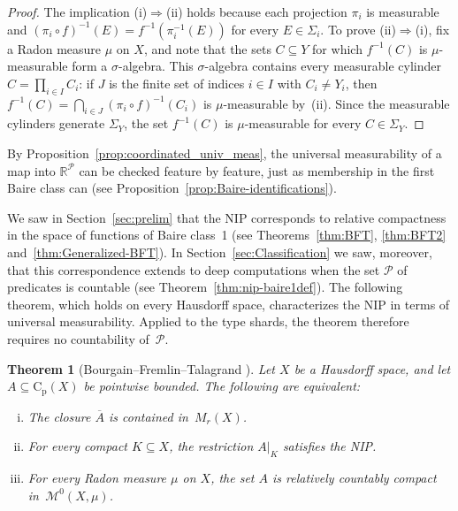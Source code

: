 \documentclass[psamsfonts]{amsart}
\newtheorem{thm}{Theorem}[section]
\theoremstyle{definition}
\theoremstyle{remark}
\newcommand{\Cp}{\mathrm{C}_{\mathrm{p}}}
\numberwithin{equation}{section}
\begin{document}
\begin{proof}
  The implication (i)$\Rightarrow$(ii) holds because each projection $\pi_i$ is measurable and $(\pi_i\circ f)^{-1}(E)=f^{-1}(\pi_i^{-1}(E))$ for every $E\in\Sigma_i$.
  To prove (ii)$\Rightarrow$(i), fix a Radon measure $\mu$ on $X$, and note that the sets $C\subseteq Y$ for which $f^{-1}(C)$ is $\mu$-measurable form a $\sigma$-algebra.
  This $\sigma$-algebra contains every measurable cylinder $C=\prod_{i\in I}C_i$:
  if $J$ is the finite set of indices $i\in I$ with $C_i\neq Y_i$, then $f^{-1}(C)=\bigcap_{i\in J}(\pi_i\circ f)^{-1}(C_i)$ is $\mu$-measurable by~(ii).
  Since the measurable cylinders generate $\Sigma_Y$, the set $f^{-1}(C)$ is $\mu$-measurable for every $C\in\Sigma_Y$.
\end{proof}

By Proposition~\ref{prop:coordinated_univ_meas}, the universal measurability of a map into $\mathbb{R}^\mathcal{P}$ can be checked feature by feature, just as membership in the first Baire class can (see Proposition~\ref{prop:Baire-identifications}).

We saw in Section~\ref{sec:prelim} that the NIP corresponds to relative compactness in the space of functions of Baire class~1 (see Theorems~\ref{thm:BFT}, \ref{thm:BFT2} and~\ref{thm:Generalized-BFT}).
In Section~\ref{sec:Classification} we saw, moreover, that this correspondence extends to deep computations when the set $\mathcal{P}$ of predicates is countable (see Theorem~\ref{thm:nip-baire1def}).
The following theorem, which holds on every Hausdorff space, characterizes the NIP in terms of universal measurability.
Applied to the type shards, the theorem therefore requires no countability of~$\mathcal{P}$.

\begin{thm}
  [Bourgain--Fremlin--Talagrand {\cite[Theorem~2F]{BFT_1978_PCompactBaire}}]
  \label{thm:BFT-2F}
  Let $X$ be a Hausdorff space, and let $A\subseteq \Cp(X)$ be pointwise bounded.
  The following are equivalent:
  \begin{enumerate}[(i)]
  \item
    The closure $\overline{A}$ is contained in~$M_r(X)$.
  \item
    For every compact $K\subseteq X$, the restriction $A|_K$ satisfies the NIP.
  \item
    For every Radon measure $\mu$ on $X$, the set $A$ is relatively countably compact in~$\mathscr{M}^0(X,\mu)$.
  \end{enumerate}
\end{thm}
\end{document}
